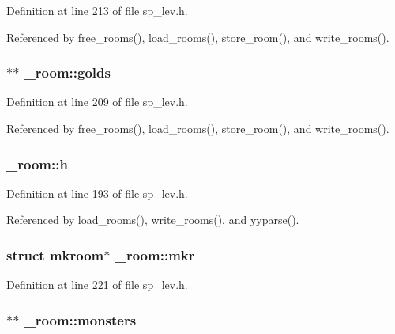 Definition at line 213 of file sp\+\_\+lev.\+h.



Referenced by free\+\_\+rooms(), load\+\_\+rooms(), store\+\_\+room(), and write\+\_\+rooms().

\hypertarget{struct__room_a098fb9c2d338496af31b6219a81eb3ab}{
\subsubsection[{golds}]{$\ast$$\ast$ \+\_\+room\+::golds}}\label{struct__room_a098fb9c2d338496af31b6219a81eb3ab}


Definition at line 209 of file sp\+\_\+lev.\+h.



Referenced by free\+\_\+rooms(), load\+\_\+rooms(), store\+\_\+room(), and write\+\_\+rooms().

\hypertarget{struct__room_a3b5a0d626176f0e352f910f2b341dfa0}{
\subsubsection[{h}]{ \+\_\+room\+::h}}\label{struct__room_a3b5a0d626176f0e352f910f2b341dfa0}


Definition at line 193 of file sp\+\_\+lev.\+h.



Referenced by load\+\_\+rooms(), write\+\_\+rooms(), and yyparse().

\hypertarget{struct__room_a64890d3c7d8c456474153a3a1dab9400}{
\subsubsection[{mkr}]{\setlength{\rightskip}{0pt plus 5cm}struct {\bf mkroom}$\ast$ \+\_\+room\+::mkr}}\label{struct__room_a64890d3c7d8c456474153a3a1dab9400}


Definition at line 221 of file sp\+\_\+lev.\+h.

\hypertarget{struct__room_a3825f14ece25f8f21e8613d5b77df092}{
\subsubsection[{monsters}]{$\ast$$\ast$ \+\_\+room\+::monsters}}\label{struct__room_a3825f14ece25f8f21e8613d5b77df092}


